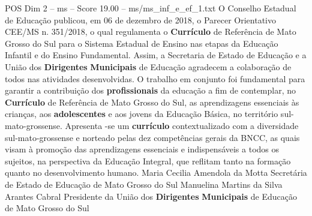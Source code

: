 \begin{textsample}{POS Dim 2 – ms – Score 19.00 – ms/ms\_inf\_e\_ef\_1.txt}
O Conselho Estadual de Educação publicou, em 06 de dezembro de 2018, o Parecer Orientativo CEE/MS n. 351/2018, o qual regulamenta o \textbf{Currículo} de Referência de Mato Grosso do Sul para o Sistema Estadual de Ensino nas etapas da Educação Infantil e do Ensino Fundamental.
Assim, a Secretaria de Estado de Educação e a União dos \textbf{Dirigentes} \textbf{Municipais} de Educação agradecem a colaboração de todos nas atividades desenvolvidas.
O trabalho em conjunto foi fundamental para garantir a contribuição dos \textbf{profissionais} da educação a fim de contemplar, no \textbf{Currículo} de Referência de Mato Grosso do Sul, as aprendizagens essenciais às crianças, aos \textbf{adolescentes} e aos jovens da Educação Básica, no território sul-mato-grossense.
Apresenta -se um \textbf{currículo} contextualizado com a diversidade sul-mato-grossense e norteado pelas dez competências gerais da BNCC, as quais visam à promoção das aprendizagens essenciais e indispensáveis a todos os sujeitos, na perspectiva da Educação Integral, que reflitam tanto na formação quanto no desenvolvimento humano.
Maria Cecilia Amendola da Motta Secretária de Estado de Educação de Mato Grosso do Sul Manuelina Martins da Silva Arantes Cabral Presidente da União dos \textbf{Dirigentes} \textbf{Municipais} de Educação de Mato Grosso do Sul

\end{textsample}

